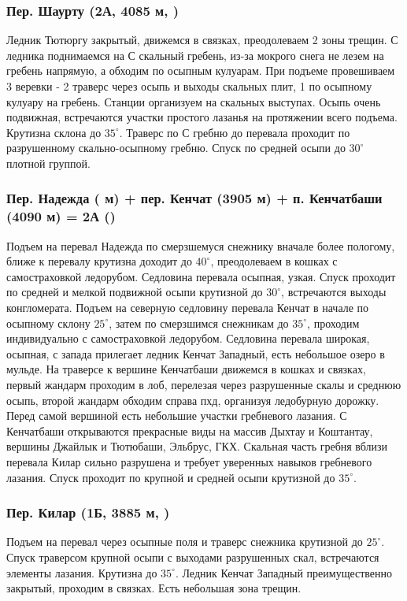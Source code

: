 		\subsubsection*{Пер. Шаурту (2А, 4085 м, )}
			Ледник Тютюргу закрытый, движемся в связках, преодолеваем 2 зоны трещин. С ледника поднимаемся на С
			скальный гребень, из-за мокрого снега не лезем на гребень напрямую, а обходим по осыпным кулуарам.
			При подъеме провешиваем 3 веревки - 2 траверс через осыпь и выходы скальных плит, 1 по осыпному кулуару
			на гребень. Станции организуем на скальных выступах. Осыпь очень подвижная, встречаются участки простого
			лазанья на протяжении всего подъема. Крутизна склона до $35^\circ$. Траверс по С гребню до перевала
			проходит по разрушенному скально-осыпному гребню. Спуск по средней осыпи до $30^\circ$ плотной группой.
		
		\subsubsection*{Пер. Надежда ( м) + пер. Кенчат (3905 м) + п. Кенчатбаши (4090 м) = 2А ()}
			Подъем на перевал Надежда по смерзшемуся снежнику вначале более пологому, ближе к перевалу крутизна
			доходит до $40^\circ$, преодолеваем в кошках с самостраховкой ледорубом. Седловина перевала осыпная,
			узкая. Спуск проходит по средней и мелкой подвижной осыпи крутизной до $30^\circ$, встречаются выходы
			конгломерата. Подъем на северную седловину перевала Кенчат в начале по осыпному склону $25^\circ$,
			затем по смерзшимся снежникам до $35^\circ$, проходим индивидуально с самостраховкой ледорубом.
			Седловина перевала широкая, осыпная, с запада прилегает ледник Кенчат Западный, есть небольшое озеро
			в мульде. На траверсе к вершине Кенчатбаши движемся в кошках и связках, первый жандарм проходим в лоб,
			перелезая через разрушенные скалы и среднюю осыпь, второй жандарм обходим справа пхд, организуя
			ледобурную дорожку. Перед самой вершиной есть небольшие участки гребневого лазания. С Кенчатбаши
			открываются прекрасные виды на массив Дыхтау и Коштантау, вершины Джайлык и Тютюбаши, Эльбрус, ГКХ.
			Скальная часть гребня вблизи перевала Килар сильно разрушена и требует уверенных навыков гребневого
			лазания. Спуск проходит по крупной и средней осыпи крутизной до $35^\circ$.

		\subsubsection*{Пер. Килар (1Б, 3885 м, )}
			Подъем на перевал через осыпные поля и траверс снежника крутизной до $25^\circ$. Спуск траверсом
			крупной осыпи с выходами разрушенных скал, встречаются элементы лазания. Крутизна до $35^\circ$.
			Ледник Кенчат Западный преимущественно закрытый, проходим в связках. Есть небольшая зона трещин.
		
